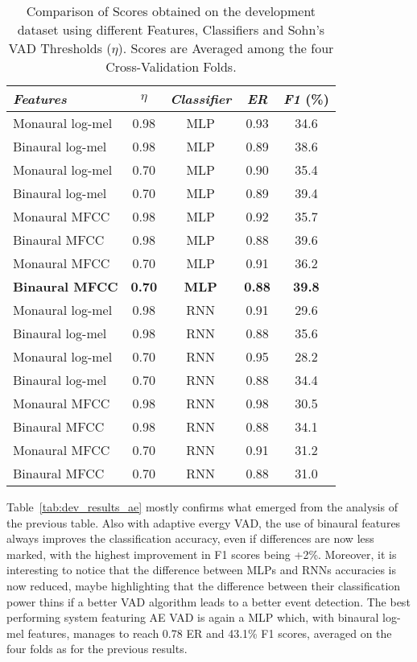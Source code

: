 \begin{table}
	\caption{Comparison of Scores obtained on the development dataset using different Features, Classifiers and Sohn's VAD Thresholds ($\eta$). Scores are Averaged among the four Cross-Validation Folds.}
	\label{tab:dev_results_sohn}
	\centering
	\begin{tabular}{l c c c c}\toprule
		\emph{Features} & \emph{$\eta$} & \emph{Classifier} & \emph{ER} & \emph{F1} (\%)\\
		\midrule
		Monaural log-mel & 0.98 & MLP & 0.93 & 34.6\\
		Binaural log-mel & 0.98 & MLP & 0.89 & 38.6\\
		\midrule
		Monaural log-mel & 0.70 & MLP & 0.90 & 35.4\\
		Binaural log-mel & 0.70 & MLP & 0.89 & 39.4\\
		\midrule
		Monaural MFCC & 0.98 & MLP & 0.92 & 35.7\\
		Binaural MFCC & 0.98 & MLP & 0.88 & 39.6\\
		\midrule
		Monaural MFCC & 0.70 & MLP & 0.91 & 36.2\\
		\textbf{Binaural MFCC} & \textbf{0.70} & \textbf{MLP} & \textbf{0.88} & \textbf{39.8}\\
		\midrule
		Monaural log-mel & 0.98 & RNN & 0.91 & 29.6\\
		Binaural log-mel & 0.98 & RNN & 0.88 & 35.6\\
		\midrule
		Monaural log-mel & 0.70 & RNN & 0.95 & 28.2\\
		Binaural log-mel & 0.70 & RNN & 0.88 & 34.4\\
		\midrule
		Monaural MFCC & 0.98 & RNN & 0.98 & 30.5\\
		Binaural MFCC & 0.98 & RNN & 0.88 & 34.1\\
		\midrule
		Monaural MFCC & 0.70 & RNN & 0.91 & 31.2\\
		Binaural MFCC & 0.70 & RNN & 0.88 & 31.0\\
		\bottomrule
	\end{tabular}
\end{table}

Table~\ref{tab:dev_results_ae} mostly confirms what emerged from the analysis of the previous table. Also with adaptive evergy VAD, the use of binaural features always improves the classification accuracy, even if differences are now less marked, with the highest improvement in F1 scores being +2\%. Moreover, it is interesting to notice that the difference between MLPs and RNNs accuracies is now reduced, maybe highlighting that the difference between their classification power thins if a better VAD algorithm leads to a better event detection. The best performing system featuring AE VAD is again a MLP which, with binaural log-mel features, manages to reach 0.78 ER and 43.1\% F1 scores, averaged on the four folds as for the previous results.

